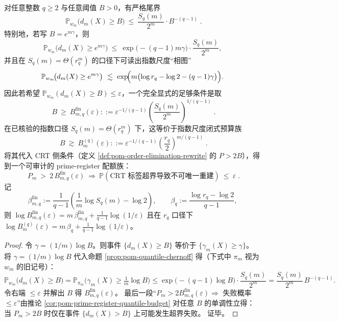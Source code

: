 \begin{corollary}\label{cor:pom-prime-register-q-quota-family}
对任意整数 \(q\ge 2\) 与任意阈值 \(B>0\)，有严格尾界
\[
\boxed{\;
\mathbb{P}_{w_m}\!\bigl(d_m(X)\ge B\bigr)
\ \le\
\frac{S_q(m)}{2^m}\cdot B^{-(q-1)}\; }.
\]
特别地，若写 \(B=e^{m\gamma}\)，则
\[
\mathbb{P}_{w_m}\!\bigl(d_m(X)\ge e^{m\gamma}\bigr)
\ \le\
\exp\!\bigl(-(q-1)m\gamma\bigr)\cdot \frac{S_q(m)}{2^m},
\]
并且在 \(S_q(m)=\Theta(r_q^m)\) 的口径下可读出指数尺度“相图”
\[
\mathbb{P}_{w_m}\!\bigl(d_m(X)\ge e^{m\gamma}\bigr)
\ \lesssim\
\exp\!\Bigl(m\bigl(\log r_q-\log 2-(q-1)\gamma\bigr)\Bigr).
\]
因此若希望 \(\mathbb{P}_{w_m}(d_m(X)\ge B)\le \varepsilon\)，一个完全显式的足够条件是取
\[
\boxed{\;
B\ \ge\ B_{m,q}^{\mathrm{fin}}(\varepsilon)
::=\varepsilon^{-1/(q-1)}\left(\frac{S_q(m)}{2^m}\right)^{\!1/(q-1)}\; }.
\]
在已核验的指数口径 \(S_q(m)=\Theta(r_q^m)\) 下，这等价于指数尺度闭式预算族
\[
\boxed{\;
B\ \gtrsim\ B_m^{(q)}(\varepsilon)
::=\varepsilon^{-1/(q-1)}\left(\frac{r_q}{2}\right)^{\!m/(q-1)}\; }.
\]
将其代入 CRT 侧条件（定义 \ref{def:pom-order-elimination-rewrite} 的 \(P>2B\)），得到一个可审计的 prime-register 配额族：
\[
\boxed{\;
P_m\ >\ 2\,B_{m,q}^{\mathrm{fin}}(\varepsilon)
\ \Longrightarrow\
\mathbb{P}(\text{CRT 标签超界导致不可唯一重建})\ \le\ \varepsilon\; }.
\]
记
\[
\beta_{m,q}^{\mathrm{fin}}
:=\frac{1}{q-1}\left(\frac{1}{m}\log S_q(m)-\log 2\right),
\qquad
\beta_q:=\frac{\log r_q-\log 2}{q-1},
\]
则
\(
\log B_{m,q}^{\mathrm{fin}}(\varepsilon)
=m\,\beta_{m,q}^{\mathrm{fin}}+\frac{1}{q-1}\log(1/\varepsilon)
\)
且在 \(r_q\) 口径下
\(
\log B_m^{(q)}(\varepsilon)=m\,\beta_q+\frac{1}{q-1}\log(1/\varepsilon)
\)。
\end{corollary}
\begin{proof}
令 \(\gamma=(1/m)\log B\)。则事件 \(\{d_m(X)\ge B\}\) 等价于 \(\{\gamma_m(X)\ge \gamma\}\)。
将 \(\gamma=(1/m)\log B\) 代入命题 \ref{prop:pom-quantile-chernoff} 得（下式中 \(\pi_m\) 视为 \(w_m\) 的旧记号）：
\[
\mathbb{P}_{w_m}\!\bigl(d_m(X)\ge B\bigr)
=\mathbb{P}_{\pi_m}\!\bigl(\gamma_m(X)\ge \tfrac{1}{m}\log B\bigr)
\le
\exp\!\bigl(-(q-1)\log B\bigr)\cdot \frac{S_q(m)}{2^m}
=\frac{S_q(m)}{2^m}\,B^{-(q-1)}.
\]
令右端 \(\le \varepsilon\) 并解出 \(B\) 得 \(B_{m,q}^{\mathrm{fin}}(\varepsilon)\)。
最后一段“\(P_m>2B_{m,q}^{\mathrm{fin}}(\varepsilon)\Rightarrow\) 失败概率 \(\le\varepsilon\)”由推论 \ref{cor:pom-prime-register-quantile-budget} 对任意 \(B\) 的单调性立得：当 \(P_m>2B\) 时仅在事件 \(\{d_m(X)>B\}\) 上可能发生超界失败。
证毕。
\end{proof}

